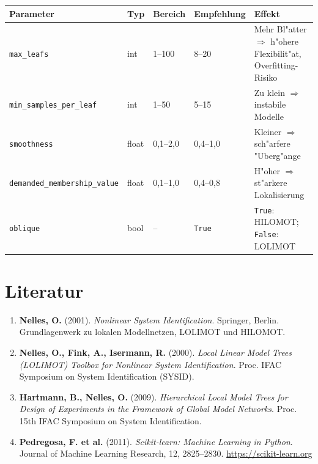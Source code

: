 \documentclass[12pt,a4paper]{article}
\begin{document}
\begin{center}
\begin{tabular}{p{4cm}p{1.2cm}p{2.2cm}p{2cm}p{4.5cm}}
  \toprule
  \textbf{Parameter} & \textbf{Typ} & \textbf{Bereich} & \textbf{Empfehlung} & \textbf{Effekt} \\
  \midrule
  \texttt{max\_leafs} & int & 1--100 & 8--20 & Mehr Bl"atter $\Rightarrow$ h"ohere Flexibilit"at, Overfitting-Risiko \\
  \texttt{min\_samples\_per\_leaf} & int & 1--50 & 5--15 & Zu klein $\Rightarrow$ instabile Modelle \\
  \texttt{smoothness} & float & 0{,}1--2{,}0 & 0{,}4--1{,}0 & Kleiner $\Rightarrow$ sch"arfere "Uberg"ange \\
  \texttt{demanded\_membership\_value} & float & 0{,}1--1{,}0 & 0{,}4--0{,}8 & H"oher $\Rightarrow$ st"arkere Lokalisierung \\
  \texttt{oblique} & bool & -- & \texttt{True} & \texttt{True}: HILOMOT; \texttt{False}: LOLIMOT \\
  \bottomrule
\end{tabular}
\end{center}

\section{Literatur}

\begin{enumerate}
  \item \textbf{Nelles, O.} (2001). \textit{Nonlinear System Identification}. Springer, Berlin.\\
    Grundlagenwerk zu lokalen Modellnetzen, LOLIMOT und HILOMOT.

  \item \textbf{Nelles, O., Fink, A., Isermann, R.} (2000). \textit{Local Linear Model Trees (LOLIMOT) Toolbox for Nonlinear System Identification}. Proc. IFAC Symposium on System Identification (SYSID).

  \item \textbf{Hartmann, B., Nelles, O.} (2009). \textit{Hierarchical Local Model Trees for Design of Experiments in the Framework of Global Model Networks}. Proc. 15th IFAC Symposium on System Identification.

  \item \textbf{Pedregosa, F. et al.} (2011). \textit{Scikit-learn: Machine Learning in Python}. Journal of Machine Learning Research, 12, 2825--2830. \url{https://scikit-learn.org}
\end{enumerate}
\end{document}
